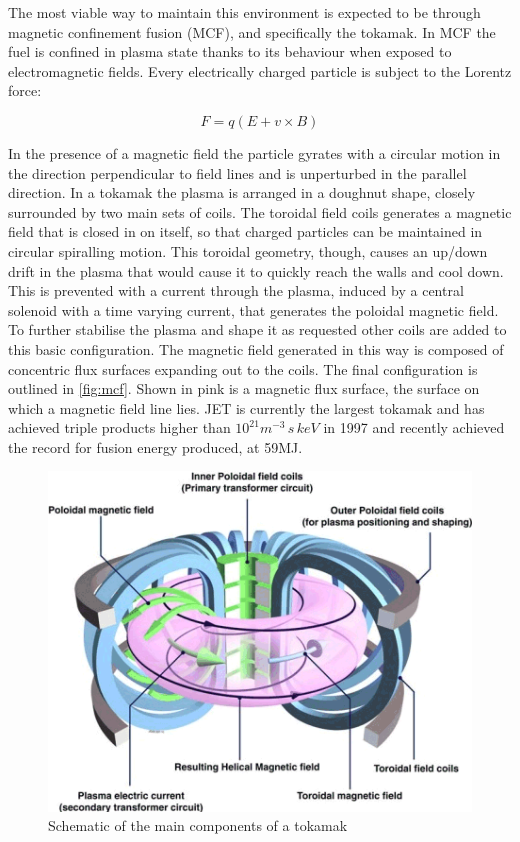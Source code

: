 The most viable way to maintain this environment is expected to be
through magnetic confinement fusion (MCF), and specifically the tokamak.
In MCF the fuel is confined in plasma state thanks to its behaviour when exposed to electromagnetic fields. Every electrically charged particle is subject to the Lorentz force:


\begin{equation}
F = q ( E+ v \times B )
\label{eq:lorentz}
\end{equation}

In the presence of a magnetic field the particle gyrates with a circular motion in the direction perpendicular to field lines and is unperturbed in the parallel direction. In a tokamak the plasma is arranged in a doughnut shape, closely surrounded by two main sets of coils. The toroidal field coils generates a magnetic field that is closed in on itself, so that charged particles can be maintained in circular spiralling motion. This toroidal geometry, though, causes an up/down drift in the plasma that would cause it to quickly reach the walls and cool down. This is prevented with a current through the plasma, induced by a central solenoid with a time varying current, that generates the poloidal magnetic field. To further stabilise the plasma and shape it as requested other coils are added to this basic configuration.\cite{Chen1974} The magnetic field generated in this way is composed of concentric flux surfaces expanding out to the coils. The final configuration is outlined in \autoref{fig:mcf}. Shown in pink is a magnetic flux surface, the surface on which a magnetic field line lies. JET is currently the largest tokamak and has achieved triple products higher than $10^{21} m^{-3}\,s\,keV$ in 1997 \cite{Gormezano1998} and recently achieved the record for fusion energy produced, at 59MJ. \cite{Gibney2022}

\begin{figure}[!ht]
	\centering
	\includegraphics[width=0.7\linewidth]{Chapters/chapter1/figs/mcf.png}
	\caption{Schematic of the main components of a tokamak \cite{CulhamCentreforFusionEnergy2018}}
	\label{fig:mcf}
\end{figure}

